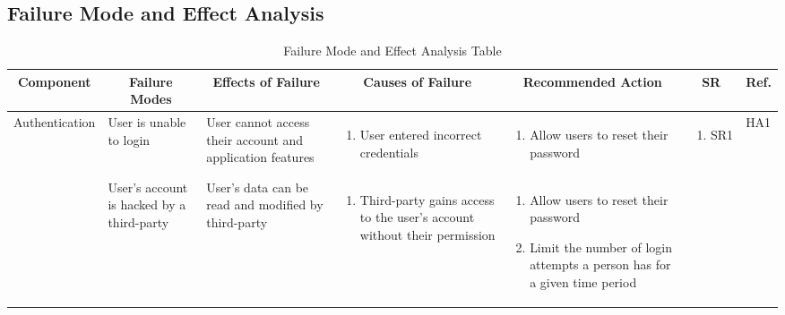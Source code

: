\documentclass{article}
\begin{document}
\newpage
\begin{landscape}
    \section{Failure Mode and Effect Analysis}
    \begin{longtable}{|p{}|p{}|p{}|p{}|p{}|p{}|p{}|}
        \caption{Failure Mode and Effect Analysis Table}  \\
		\hline
        \multicolumn{1}{|c|}{\textbf{Component}}
		& \multicolumn{1}{|c|}{\textbf{Failure Modes}}
		& \multicolumn{1}{|c|}{\textbf{Effects of Failure}}
		& \multicolumn{1}{|c|}{\textbf{Causes of Failure}}
		& \multicolumn{1}{|c|}{\textbf{Recommended Action}}
		& \multicolumn{1}{|c|}{\textbf{SR}}
		& \multicolumn{1}{|c|}{\textbf{Ref.}}  \\
        \hline
        Authenti\-cation
        & User is unable to login
        & User cannot access their account and application features
        & \begin{enumerate}[label=\alph*., leftmargin=*]
            \item User entered incorrect credentials
        \end{enumerate}
        & \begin{enumerate}[label=\alph*., leftmargin=*]
            \item Allow users to reset their password
        \end{enumerate}
        & \begin{enumerate}[label=\alph*., leftmargin=*]
            \item SR1
        \end{enumerate}
        & HA1 \\
        \cline{2-7}
        & User's account is hacked by a third-party
        & User's data can be read and modified by third-party
        & \begin{enumerate}[label=\alph*., leftmargin=*]
            \item Third-party gains access to the  user's account without their permission
        \end{enumerate}
        & \begin{enumerate}[label=\alph*., leftmargin=*]
            \item Allow users to reset their password
            \item Limit the number of login attempts a person has for a given time period

\end{enumerate}
\end{longtable}
\end{landscape}
\end{document}
